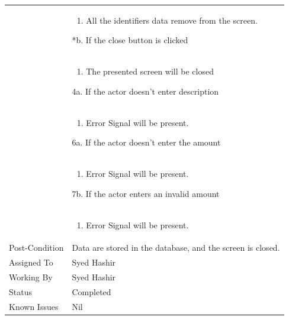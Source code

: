 \documentclass[12pt,a4paper]{article}
\begin{document}
\begin{longtable}{| p{3cm}|p{12cm}|}
& \begin{enumerate}
		\item All the identifiers data remove from the screen.
	\end{enumerate}
*b. If the close button is clicked\\
&	\begin{enumerate}
		\item The presented screen will be closed
	\end{enumerate}
4a. If the actor doesn't enter description \\ 	
&	\begin{enumerate}
		\item Error Signal will be present.
	\end{enumerate}
6a. If the actor doesn't enter the amount\\ 	
&	\begin{enumerate}
		\item Error Signal will be present.
	\end{enumerate}
7b. If the actor enters an invalid amount\\ 	
&	\begin{enumerate}
		\item Error Signal will be present.
	\end{enumerate}
\\ \hline
Post-Condition & Data are stored in the database, and the screen is closed.  \\\hline
Assigned To &  Syed Hashir
\\ \hline
Working By &   Syed Hashir
\\ \hline
Status & 	Completed	
\\ \hline
Known Issues & Nil
\\\hline
\end{longtable}
\end{document}
